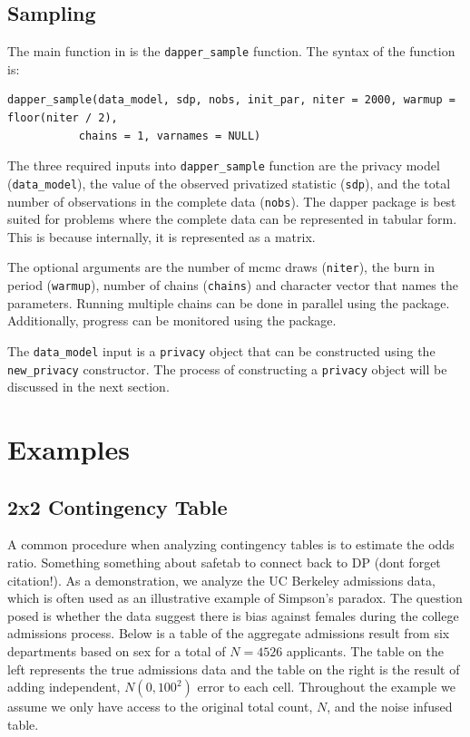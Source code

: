 \hypertarget{sampling}{%
\subsection{Sampling}\label{sampling}}

The main function in  is the \texttt{dapper\_sample} function. The syntax of the function is:

\begin{verbatim}
dapper_sample(data_model, sdp, nobs, init_par, niter = 2000, warmup = floor(niter / 2),
           chains = 1, varnames = NULL)
\end{verbatim}

The three required inputs into \texttt{dapper\_sample} function are the privacy model (\texttt{data\_model}), the value
of the observed privatized statistic (\texttt{sdp}), and the total number of observations
in the complete data (\texttt{nobs}). The dapper
package is best suited for problems where the complete data can be represented in
tabular form. This is because internally, it is represented as a matrix.

The optional arguments are the number of mcmc draws (\texttt{niter}), the
burn in period (\texttt{warmup}), number of chains (\texttt{chains}) and character
vector that names the parameters. Running multiple chains can be done in parallel
using the  package. Additionally, progress can be monitored
using the  package.

The \texttt{data\_model} input is a \texttt{privacy}
object that can be constructed using the \texttt{new\_privacy} constructor. The
process of constructing a \texttt{privacy} object will be discussed in the next section.

\hypertarget{examples}{%
\section{Examples}\label{examples}}

\hypertarget{x2-contingency-table}{%
\subsection{2x2 Contingency Table}\label{x2-contingency-table}}

A common procedure when analyzing contingency tables is to estimate the
odds ratio. Something something about safetab to connect back to DP (dont forget citation!).
As a demonstration, we analyze the UC Berkeley admissions data, which is often
used as an illustrative example of Simpson's paradox. The question posed is whether
the data suggest there is bias against females during the college admissions
process. Below is a table of the aggregate admissions result from six departments based on sex
for a total of \(N = 4526\) applicants. The table on the left represents
the true admissions data and the table on the right is the result of adding
independent, \(N(0,100^2)\) error to each cell. Throughout the example
we assume we only have access to the original total count, \(N\), and
the noise infused table.

